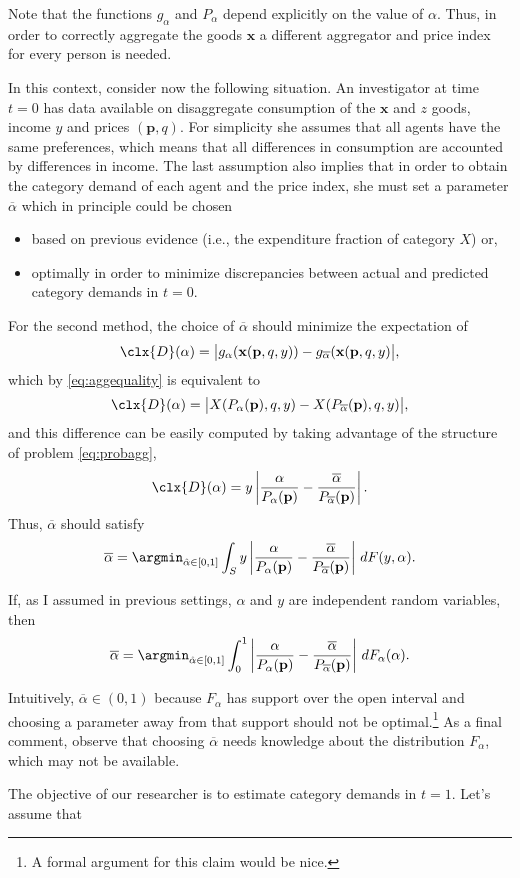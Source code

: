 \documentclass[english, a4paper,12pt]{article}
\begin{document}
Note that the functions $g_{\alpha}$ and $P_{\alpha}$ depend explicitly on the value of $\alpha$. Thus, in order to correctly aggregate the goods $\mathbf{x}$ a different aggregator and price index for every person is needed.

In this context, consider now the following situation. An investigator at time $t = 0$ has data available on disaggregate consumption of the $\mathbf{x}$ and $z$ goods, income $y$ and prices $(\mathbf{p},q)$. For simplicity she assumes that all agents have the same preferences, which means that all differences in consumption are accounted by differences in income. The last assumption also implies that in order to obtain the category demand of each agent and the price index, she must set a parameter $\overline{\alpha}$ which in principle could be chosen
	\begin{itemize}
		\item based on previous evidence (i.e., the expenditure fraction of category $X$) or,
		\item optimally in order to minimize discrepancies between actual and predicted category demands in $t = 0$.
	\end{itemize}

For the second method, the choice of $\overline{\alpha}$ should minimize the expectation of
	$$\clx{D}(\alpha) = \big| g_{\alpha}(\mathbf{x}(\mathbf{p}, q, y)) - g_{\overline{\alpha}}(\mathbf{x}(\mathbf{p}, q, y) \big|,$$
which by \eqref{eq:aggequality} is equivalent to
	$$\clx{D}(\alpha) = \big| X(P_{\alpha}(\mathbf{p}), q, y) - X(P_{\overline{\alpha}}(\mathbf{p}), q, y) \big|,$$
and this difference can be easily computed by taking advantage of the structure of problem \eqref{eq:probagg},
	$$\clx{D}(\alpha) = y\left| \frac{\alpha}{P_{\alpha}(\mathbf{p})} - \frac{\overline{\alpha}}{P_{\overline{\alpha}}(\mathbf{p})} \right|.$$
Thus, $\overline{\alpha}$ should satisfy
	\[
		\overline{\alpha}
			=	\argmin_{\hat{\alpha} \in [0,1]} 
					\int_{S} y\left| \frac{\alpha}{P_{\alpha}(\mathbf{p})} 
							- \frac{\overline{\alpha}}{P_{\overline{\alpha}}(\mathbf{p})} \right|\, dF(y,\alpha).
	\]
	
If, as I assumed in previous settings, $\alpha$ and $y$ are independent random variables, then
	\begin{equation} \label{eq:overalpha}
		\overline{\alpha}
			=	\argmin_{\hat{\alpha} \in [0,1]} 
					\int_{0}^{1} \left| \frac{\alpha}{P_{\alpha}(\mathbf{p})} 
							- \frac{\overline{\alpha}}{P_{\overline{\alpha}}(\mathbf{p})} \right|\, dF_{\alpha}(\alpha).
	\end{equation}
	
Intuitively, $\overline{\alpha} \in (0,1)$ because $F_{\alpha}$ has support over the open interval and choosing a parameter away from that support should not be optimal.\footnote{A formal argument for this claim would be nice.} As a final comment, observe that choosing $\overline{\alpha}$ needs knowledge about the distribution $F_{\alpha}$, which may not be available.

The objective of our researcher is to estimate category demands in $t = 1$. Let's assume that 
	


\end{document}
